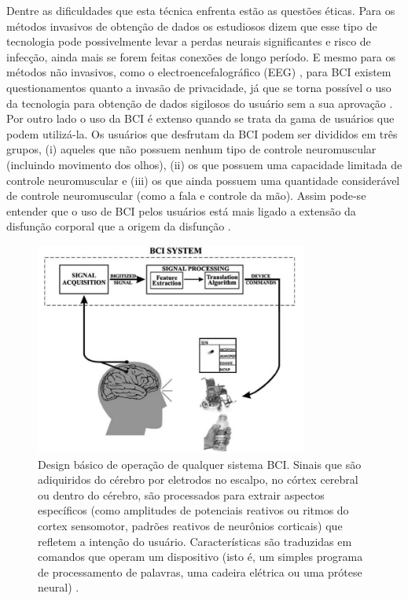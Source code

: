 Dentre as dificuldades que esta técnica enfrenta estão as questões éticas. Para os métodos invasivos de obtenção de dados os estudiosos dizem que esse tipo de tecnologia pode possivelmente levar a perdas neurais significantes e risco de infecção, ainda mais se forem feitas conexões de longo período. E mesmo para os métodos não invasivos, como o electroencefalográfico (EEG) \cite{daly2009feasibility}, para BCI existem questionamentos quanto a invasão de privacidade, já que se torna possível o uso da tecnologia para obtenção de dados sigilosos do usuário sem a sua aprovação \cite{wolpaw2006bci}. Por outro lado o uso da BCI é extenso quando se trata da gama de usuários que podem utilizá-la. Os usuários que desfrutam da BCI podem ser divididos em três grupos, (i) aqueles que não possuem nenhum tipo de controle neuromuscular (incluindo movimento dos olhos), (ii) os que possuem uma capacidade limitada de controle neuromuscular e (iii) os que ainda possuem uma quantidade considerável de controle neuromuscular (como a fala e  controle da mão). Assim pode-se entender que o uso de BCI pelos usuários está mais ligado a extensão da disfunção corporal que a origem da disfunção \cite{wolpaw2006bci}.

\begin{figure}[H]
\centering
\includegraphics[width = 0.8\textwidth]{img/Schalk2004_BCI.JPG}
\caption[Design Básico de Operação para Qualquer Sistema BCI]{Design básico de operação de qualquer sistema BCI. Sinais que são adiquiridos do cérebro por eletrodos no escalpo, no córtex cerebral ou dentro do cérebro, são processados para extrair aspectos específicos (como amplitudes de potenciais reativos ou ritmos do cortex sensomotor, padrões reativos de neurônios corticais) que refletem a intenção do usuário. Características são traduzidas em comandos que operam um dispositivo (isto é, um simples programa de processamento de palavras, uma cadeira elétrica ou uma prótese neural) \cite{schalk2004bci2000}.}
\label{Schalk2004_BCI}
\end{figure}

